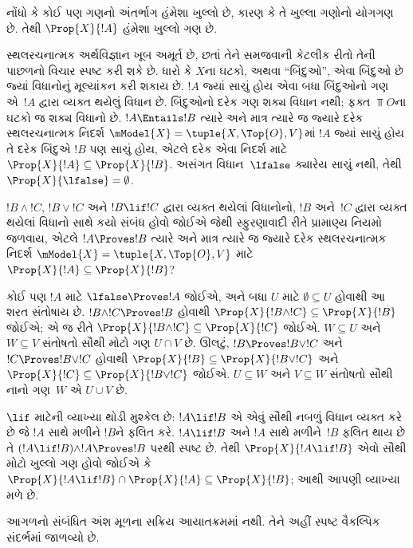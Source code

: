 નોંધો કે કોઈ પણ ગણનો અંતર્ભાગ હંમેશા ખુલ્લો છે, કારણ કે
તે ખુલ્લા ગણોનો યોગગણ છે. તેથી $\Prop{X}{!A}$ હંમેશા
ખુલ્લો ગણ છે.

સ્થલરચનાત્મક અર્થવિજ્ઞાન ખૂબ અમૂર્ત છે, છતાં તેને સમજવાની
કેટલીક રીતો તેની પાછળનો વિચાર સ્પષ્ટ કરી શકે છે. ધારો કે
$X$ના ઘટકો, અથવા ``બિંદુઓ'', એવા બિંદુઓ છે જ્યાં
વિધાનોનું મૂલ્યાંકન કરી શકાય છે. $!A$ જ્યાં સાચું હોય એવા
બધા બિંદુઓનો ગણ એ~$!A$ દ્વારા વ્યક્ત થયેલું વિધાન છે.
બિંદુઓનો દરેક ગણ શક્ય વિધાન નથી; ફક્ત $\Top{O}$ના
ઘટકો જ શક્ય વિધાનો છે. $!A \Entails !B$
ત્યારે અને માત્ર ત્યારે જ જ્યારે દરેક સ્થલરચનાત્મક નિદર્શ
$\mModel{X}=\tuple{X,\Top{O},V}$માં $!A$ જ્યાં સાચું હોય તે
દરેક બિંદુએ $!B$ પણ સાચું હોય, એટલે દરેક એવા નિદર્શ માટે
$\Prop{X}{!A} \subseteq \Prop{X}{!B}$. અસંગત વિધાન~$\lfalse$ ક્યારેય
સાચું નથી, તેથી $\Prop{X}{\lfalse} = \emptyset$.

$!B \land !C$, $!B \lor !C$ અને $!B \lif !C$ દ્વારા
વ્યક્ત થયેલાં વિધાનોનો, $!B$ અને~$!C$ દ્વારા વ્યક્ત થયેલાં
વિધાનો સાથે કયો સંબંધ હોવો જોઈએ જેથી સ્ફુરણાવાદી રીતે
પ્રામાણ્ય નિયમો જળવાય, એટલે $!A \Proves !B$ ત્યારે અને માત્ર
ત્યારે જ જ્યારે દરેક સ્થલરચનાત્મક નિદર્શ
$\mModel{X}=\tuple{X,\Top{O},V}$ માટે
$\Prop{X}{!A} \subseteq \Prop{X}{!B}$?


કોઈ પણ $!A$ માટે $\lfalse \Proves !A$ જોઈએ, અને બધા
$U$ માટે $\emptyset \subseteq U$ હોવાથી આ શરત સંતોષાય
છે. $!B \land !C \Proves !B$ હોવાથી
$\Prop{X}{!B \land !C} \subseteq \Prop{X}{!B}$ જોઈએ;
એ જ રીતે $\Prop{X}{!B \land !C} \subseteq \Prop{X}{!C}$
જોઈએ. $W \subseteq U$ અને $W \subseteq V$ સંતોષતો સૌથી
મોટો ગણ $U \cap V$ છે. ઊલટું, $!B \Proves !B \lor !C$
અને $!C \Proves !B \lor !C$ હોવાથી
$\Prop{X}{!B} \subseteq \Prop{X}{!B \lor !C}$ અને
$\Prop{X}{!C} \subseteq \Prop{X}{!B \lor !C}$ જોઈએ.
$U \subseteq W$ અને $V \subseteq W$ સંતોષતો સૌથી નાનો
ગણ~$W$ એ $U \cup V$ છે.

$\lif$ માટેની વ્યાખ્યા થોડી મુશ્કેલ છે: $!A \lif !B$ એ
એવું સૌથી નબળું વિધાન વ્યક્ત કરે છે જે $!A$ સાથે મળીને
$!B$ને ફલિત કરે. $!A \lif !B$ અને $!A$ સાથે મળીને~$!B$
ફલિત થાય છે તે $(!A \lif !B) \land !A \Proves !B $
પરથી સ્પષ્ટ છે. તેથી $\Prop{X}{!A \lif !B}$ એવો સૌથી મોટો
ખુલ્લો ગણ હોવો જોઈએ કે $\Prop{X}{!A \lif !B} \cap \Prop{X}{!A}
\subseteq \Prop{X}{!B}$; આથી આપણી વ્યાખ્યા મળે છે.
\endgroup


\OLEndChapterHook


\begin{editorial}
આગળનો સંબંધિત અંશ મૂળના સક્રિય આયાતક્રમમાં નથી. તેને અહીં સ્પષ્ટ વૈકલ્પિક સંદર્ભમાં જાળવ્યો છે.
\end{editorial}
\begingroup
\makeatletter{}\makeatother

